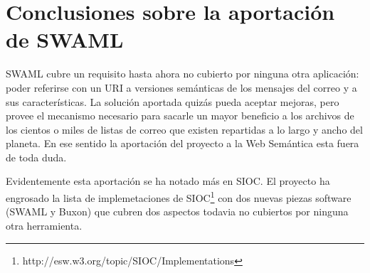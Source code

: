 
\section{Conclusiones sobre la aportación de SWAML}

SWAML cubre un requisito hasta ahora no cubierto por ninguna otra aplicación:
poder referirse con un URI a versiones semánticas de los mensajes del correo 
y a sus características. La solución aportada quizás pueda aceptar mejoras,
pero provee el mecanismo necesario para sacarle un mayor beneficio a los
archivos de los cientos o miles de listas de correo que existen repartidas a
lo largo y ancho del planeta. En ese sentido la aportación del proyecto a la
Web Semántica esta fuera de toda duda.

Evidentemente esta aportación se ha notado más en SIOC. El proyecto ha
engrosado la lista de implemetaciones de
SIOC\footnote{\url{}http://esw.w3.org/topic/SIOC/Implementations} con dos
nuevas piezas software (SWAML y Buxon) que cubren dos aspectos todavia no
cubiertos por ninguna otra herramienta.
